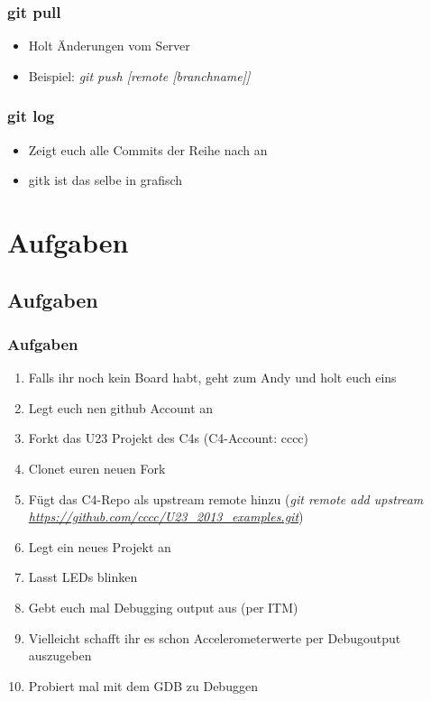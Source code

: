 \documentclass[ngerman,compress]{beamer}
\begin{document}
\begin{frame}
	\frametitle{git pull}
	\begin{itemize}
		\item Holt Änderungen vom Server
		\item Beispiel: \emph{git push [remote [branchname]]}
	\end{itemize}
\end{frame}

\begin{frame}
	\frametitle{git log}
	\begin{itemize}
		\item Zeigt euch alle Commits der Reihe nach an
		\item gitk ist das selbe in grafisch
	\end{itemize}
\end{frame}

\section{Aufgaben}
\subsection{Aufgaben}
\begin{frame}
	\frametitle{Aufgaben}
	\begin{enumerate}
		\item Falls ihr noch kein Board habt, geht zum Andy und holt euch eins
		\item Legt euch nen github Account an
		\item Forkt das U23 Projekt des C4s (C4-Account: cccc)
		\item Clonet euren neuen Fork
		\item Fügt das C4-Repo als upstream remote hinzu (\emph{git remote add upstream \url{https://github.com/cccc/U23_2013_examples.git}})
		\item Legt ein neues Projekt an
		\item Lasst LEDs blinken
		\item Gebt euch mal Debugging output aus (per ITM)
		\item Vielleicht schafft ihr es schon Accelerometerwerte per Debugoutput auszugeben
		\item Probiert mal mit dem GDB zu Debuggen
	\end{enumerate}
\end{frame}
\end{document}
